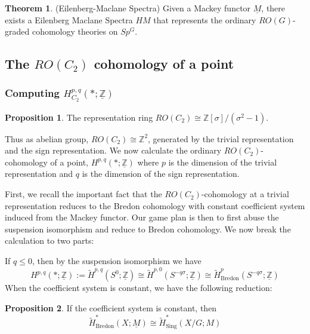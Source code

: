 \documentclass{article}
\theoremstyle{definition}
\newtheorem{theorem}{Theorem}[section]
\theoremstyle{definition}
\theoremstyle{definition}
\theoremstyle{definition}
\newtheorem{proposition}{Proposition}[theorem]
\theoremstyle{definition}
\theoremstyle{definition}
\theoremstyle{definition}
\begin{document}
\begin{tcolorbox}[colback=red!5!white,colframe=red!30!white]
\begin{theorem}
(Eilenberg-Maclane Spectra) Given a Mackey functor $\underline{M}$, there exists a Eilenberg Maclane Spectra $HM$ that represents the ordinary $RO(G)$-graded cohomology theories on $Sp^G$. 
\end{theorem}
\end{tcolorbox}


\subsection{The $RO(C_2)$ cohomology of a point}
\subsubsection{Computing $H^{p,q}_{C_2}(*; \underline{\mathbb{Z}})$}

\begin{tcolorbox}[colback=blue!5!white,colframe=blue!30!white]
\begin{proposition}
The representation ring $RO(C_2)\cong \mathbb{Z}[\sigma]/(\sigma^2-1)$. 
\end{proposition}
\end{tcolorbox}
Thus as abelian group, $RO(C_2)\cong \mathbb{Z}^2$, generated by the trivial representation and the sign representation. We now calculate the ordinary $RO(C_2)$-cohomology of a point, $H^{p,q}(*;\underline{\mathbb{Z}})$ where $p$ is the dimension of the trivial representation
and $q$ is the dimension of the sign representation. 

First, we recall the important fact that the $RO(C_2)$-cohomology at a trivial representation reduces to the Bredon cohomology with constant coefficient system induced from the Mackey functor. Our game plan is then to first abuse the suspension isomorphism and reduce to Bredon cohomology. We now break the calculation to two parts:

If $q\leq 0$, then by the suspension isomorphism we have $$H^{p,q}(*;\underline{\mathbb{Z}}):= \tilde{H}^{p,q}(S^0;\underline{\mathbb{Z}})\cong \tilde{H}^{p,0}(S^{-q\sigma};\underline{\mathbb{Z}})\cong \tilde{H}^{p}_{\textrm{Bredon}}(S^{-q\sigma};\underline{\mathbb{Z}})$$
When the coefficient system is constant, we have the following reduction:

\begin{tcolorbox}[colback=blue!5!white,colframe=blue!30!white]
\begin{proposition}
If the coefficient system is constant, then 
\[\tilde{H}^*_{\textrm{Bredon}}(X; \underline{M})\cong \tilde{H}^*_{\textrm{Sing}}(X/G; M)\]
\end{proposition}
\end{tcolorbox}
\end{document}
